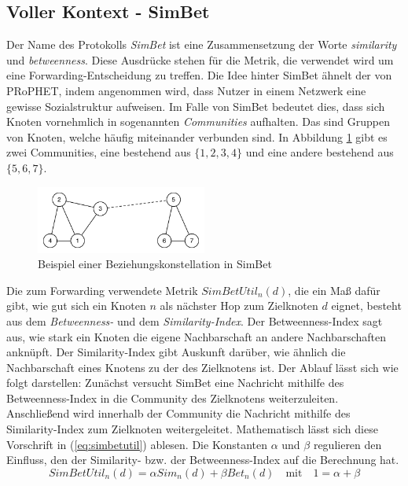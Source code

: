 \documentclass[a4paper, 12pt]{article}
\begin{document}
\subsection{Voller Kontext - SimBet}
\label{sec:simbet}
Der Name des Protokolls \emph{SimBet} \cite{daly2007social} ist eine Zusammensetzung der Worte \emph{similarity} und \emph{betweenness}. Diese Ausdrücke stehen für die Metrik, die verwendet wird um eine Forwarding-Entscheidung zu treffen.
Die Idee hinter SimBet ähnelt der von PRoPHET, indem angenommen wird, dass Nutzer in einem Netzwerk eine gewisse Sozialstruktur aufweisen. Im Falle von SimBet bedeutet dies, dass sich Knoten vornehmlich in sogenannten \emph{Communities} aufhalten. Das sind Gruppen von Knoten, welche häufig miteinander verbunden sind.
In Abbildung \ref{fig:simbet} gibt es zwei Communities, eine bestehend aus $\{1,2,3,4\}$ und eine andere bestehend aus $\{5,6,7\}$.
\begin{figure}[H]
    \centering
    \includegraphics[width=0.5\textwidth]{img/simbet.pdf}
    \caption{Beispiel einer Beziehungskonstellation in SimBet}
    \label{fig:simbet}
\end{figure}
Die zum Forwarding verwendete Metrik $SimBetUtil_n(d)$, die ein Maß dafür gibt, wie gut sich ein Knoten $n$ als nächster Hop zum Zielknoten $d$ eignet, besteht aus dem \emph{Betweenness-} und dem \emph{Similarity-Index}.
Der Betweenness-Index sagt aus, wie stark ein Knoten die eigene Nachbarschaft an andere Nachbarschaften anknüpft. Der Similarity-Index gibt Auskunft darüber, wie ähnlich die Nachbarschaft eines Knotens zu der des Zielknotens ist.
Der Ablauf lässt sich wie folgt darstellen: Zunächst versucht SimBet eine Nachricht mithilfe des Betweenness-Index in die Community des Zielknotens weiterzuleiten. Anschließend wird innerhalb der Community die Nachricht mithilfe des Similarity-Index zum Zielknoten weitergeleitet.
Mathematisch lässt sich diese Vorschrift in (\ref{eq:simbetutil}) ablesen. Die Konstanten $\alpha$ und $\beta$ regulieren den Einfluss, den der Similarity- bzw. der Betweenness-Index auf die Berechnung hat.
\begin{equation}
	\label{eq:simbetutil}
	SimBetUtil_n(d) = \alpha Sim_n(d) + \beta Bet_n(d) \quad \text{mit} \quad 1=\alpha + \beta
\end{equation}
\end{document}
